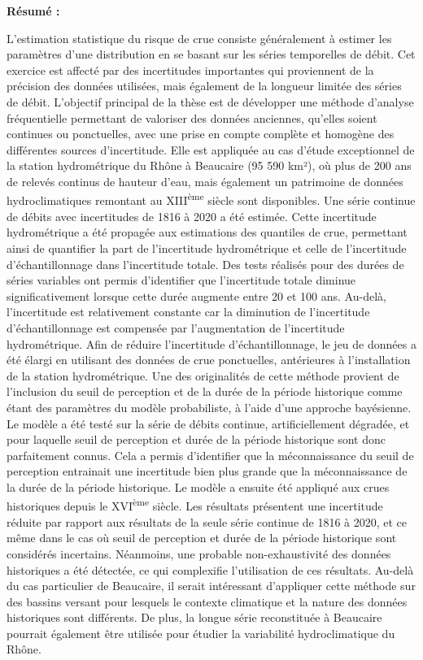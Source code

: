 \thispagestyle{empty}

\noindent \textbf{Résumé :}

\noindent \small{L'estimation statistique du risque de crue consiste généralement à estimer les paramètres d'une distribution en se basant sur les séries temporelles de débit. Cet exercice est affecté par des incertitudes importantes qui proviennent de la précision des données utilisées, mais également de la longueur limitée des séries de débit. L'objectif principal de la thèse est de développer une méthode d'analyse fréquentielle permettant de valoriser des données anciennes, qu'elles soient continues ou ponctuelles, avec une prise en compte complète et homogène des différentes sources d'incertitude. Elle est appliquée au cas d'étude exceptionnel de la station hydrométrique du Rhône à Beaucaire (95 590 km²), où plus de 200 ans de relevés continus de hauteur d'eau, mais également un patrimoine de données hydroclimatiques remontant au XIII\textsuperscript{ème} siècle sont disponibles. Une série continue de débits avec incertitudes de 1816 à 2020 a été estimée. Cette incertitude hydrométrique a été propagée aux estimations des quantiles de crue, permettant ainsi de quantifier la part de l'incertitude hydrométrique et celle de l'incertitude d'échantillonnage dans l'incertitude totale. Des tests réalisés pour des durées de séries variables ont permis d'identifier que l'incertitude totale diminue significativement lorsque cette durée augmente entre 20 et 100 ans. Au-delà, l'incertitude est relativement constante car la diminution de l'incertitude d'échantillonnage est compensée par l'augmentation de l'incertitude hydrométrique. Afin de réduire l'incertitude d'échantillonnage, le jeu de données a été élargi en utilisant des données de crue ponctuelles, antérieures à l'installation de la station hydrométrique. Une des originalités de cette méthode provient de l'inclusion du seuil de perception et de la durée de la période historique comme étant des paramètres du modèle probabiliste, à l'aide d'une approche bayésienne. Le modèle a été testé sur la série de débits continue, artificiellement dégradée, et pour laquelle seuil de perception et durée de la période historique sont donc parfaitement connus. Cela a permis d'identifier que la méconnaissance du seuil de perception entrainait une incertitude bien plus grande que la méconnaissance de la durée de la période historique. Le modèle a ensuite été appliqué aux crues historiques depuis le XVI\textsuperscript{ème} siècle. Les résultats présentent une incertitude réduite par rapport aux résultats de la seule série continue de 1816 à 2020, et ce même dans le cas où seuil de perception et durée de la période historique sont considérés incertains. Néanmoins, une probable non-exhaustivité des données historiques a été détectée, ce qui complexifie l'utilisation de ces résultats. Au-delà du cas particulier de Beaucaire, il serait intéressant d'appliquer cette méthode sur des bassins versant pour lesquels le contexte climatique et la nature des données historiques sont différents. De plus, la longue série reconstituée à Beaucaire pourrait également être utilisée pour étudier la variabilité hydroclimatique du Rhône.}

